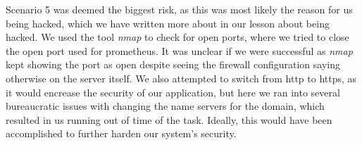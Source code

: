 Scenario 5 was deemed the biggest risk, as this was most likely the reason for us being hacked, which we have written more about in our lesson about being hacked. We used the tool \textit{nmap} to check for open ports, where we tried to close the open port used for prometheus. It was unclear if we were successful as \textit{nmap} kept showing the port as open despite seeing the firewall configuration saying otherwise on the server itself.
We also attempted to switch from http to https, as it would encrease the security of our application, but here we ran into several bureaucratic issues with changing the name servers for the domain, which resulted in us running out of time of the task. Ideally, this would have been accomplished to further harden our system's security.

